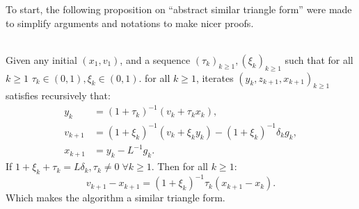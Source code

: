 \documentclass[12pt]{article}
\begin{document}
    To start, the following proposition on ``abstract similar triangle form'' were made to simplify arguments and notations to make nicer proofs. 

    \begin{proposition}\label{prop:abs-st-form}\;\\
        Given any initial $(x_1, v_1)$, and a sequence $(\tau_k)_{k \ge 1}, (\xi_k)_{k \ge 1}$ such that for all $k \ge 1$ $\tau_k \in (0, 1), \xi_k \in (0, 1)$. 
        for all $k\ge 1$, iterates $(y_k, z_{k + 1}, x_{k + 1})_{k \ge 1}$ satisfies recursively that: 
        \begin{align*}
            y_k &= (1 + \tau_k)^{-1}(v_k + \tau_k x_k),
            \\
            v_{k + 1} &= (1 + \xi_k)^{-1}(v_k + \xi_k y_k) - (1 + \xi_k)^{-1}\delta_k g_k,
            \\
            x_{k + 1} &= y_k - L^{-1} g_k. 
        \end{align*}
        If $1 + \xi_k + \tau_k = L\delta_k, \tau_k \neq 0\; \forall k \ge 1$. 
        Then for all $k \ge 1$: 
        $$
            v_{k + 1} - x_{k + 1} = (1 + \xi_k)^{-1}\tau_k(x_{k + 1} - x_k). 
        $$
        Which makes the algorithm a similar triangle form. 
    \end{proposition}
\end{document}

